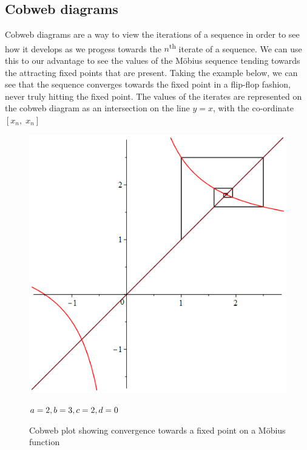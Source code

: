 \documentclass[12pt]{article}
\begin{document}
\subsection{Cobweb diagrams}\label{sec:cobs}
Cobweb diagrams are a way to view the iterations of a sequence in order to see how it develops as we progess towards the $n$\textsuperscript{th} iterate of a sequence. We can use this to our advantage to see the values of the Möbius sequence tending towards the attracting fixed points that are present. Taking the example below, we can see that the sequence converges towards the fixed point in a flip-flop fashion, never truly hitting the fixed point. The values of the iterates are represented on the cobweb diagram as an intersection on the line $y=x$, with the co-ordinate $\left[x_n,\;x_n\right]$
	\begin{figure}[H]
		\begin{minipage}{0.725\textwidth}
			\hfill
			\includegraphics[scale=0.4]{fixedPointsCobwebIg.png}
		\end{minipage}
	\hfill
		\begin{minipage}{0.2\textwidth}
			$a=2,\\b=3,\\ c=2,\\ d=0\\$
		\end{minipage}
	\caption{Cobweb plot showing convergence towards a fixed point on a Möbius function}
	\label{fig:mobAp}
	\end{figure}
\end{document}
